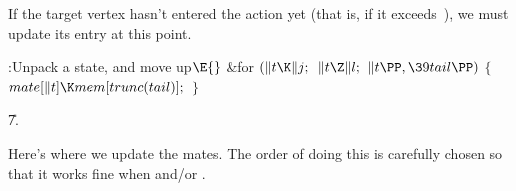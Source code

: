 If the target vertex hasn't entered the
action yet (that is, if it
exceeds~), we must update its  entry at this point.

\Y\B\4:Unpack a state, and move  up\X${}\E{}$\6
\&{for} ${}(\|t\K\|j;{}$ ${}\|t\Z\|l;{}$ ${}\|t\PP,\39\\{tail}\PP){}$\5
${}\{{}$\1\6
${}\\{mate}[\|t]\K\\{mem}[\\{trunc}(\\{tail})];{}$\6
\4${}\}{}$\2\par
\U7.\fi

Here's where we update the mates. The order
of doing this is carefully
chosen so that it works fine when  and/or .

